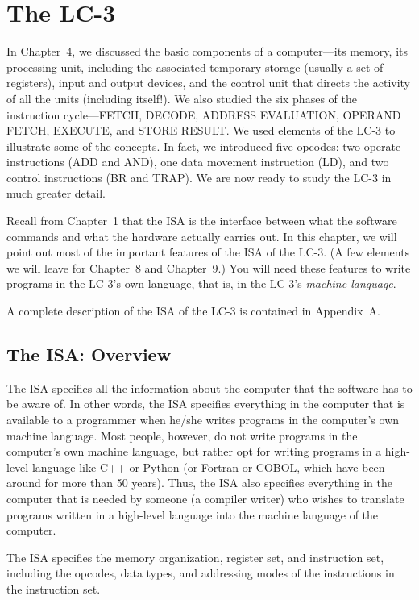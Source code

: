 \documentclass{patt}
\begin{document}
\chapter{The LC-3}\label{chapt:lc2}

In Chapter~4, we discussed the basic components of
a computer---its memory, its processing unit, including the
associated temporary storage (usually a set of registers),
input and output devices, and the control unit that directs
the activity of all the units (including itself!). We also
studied the six phases of the instruction cycle---FETCH,
DECODE, ADDRESS EVALUATION, OPERAND FETCH, EXECUTE, and STORE
RESULT. We used elements of the LC-3 to illustrate some of the concepts.
In fact, we introduced five opcodes: two operate instructions (ADD 
and AND), one data movement instruction (LD), and two control instructions
(BR and TRAP).  We are now ready to study the LC-3 in much greater detail.

\enlargethispage{-\baselineskip}

Recall from Chapter~1 that the ISA is the interface between what
the software commands and what the hardware actually carries out.
In this chapter, we will point out most of the important features 
of the ISA of the LC-3. (A few elements we will leave for Chapter~8
and Chapter~9.)  You will need these features to write programs in the 
LC-3's own language, that is, in the LC-3's {\em machine language}.


A complete description of the ISA of the LC-3 is contained in
Appendix~A.

\section{The ISA: Overview}

The ISA specifies all the information about the computer
that the software has to be aware of. In other words, the ISA
specifies everything in the computer that is available to a
programmer when he/she writes programs in
the computer's own machine language.  Most people, however, do not write
programs in the computer's own machine language, but rather opt for 
writing programs in a high-level language like C++ or Python (or Fortran 
or COBOL, which have been around for more than 50 years).  Thus, the ISA 
also specifies everything in the computer that is needed by someone 
(a compiler writer) who wishes to translate programs written in a 
high-level language into the machine language of the computer.

The ISA specifies the memory organization, register set, and
instruction set, including the opcodes, data types, and addressing modes
of the instructions in the instruction set.
\end{document}
